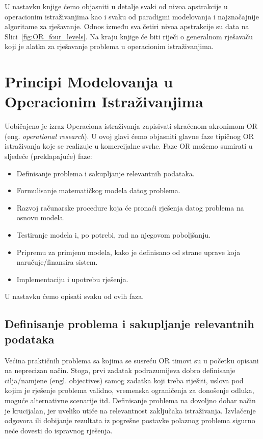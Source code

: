\documentclass[a4paper, utf8, 11pt, colorlinks]{book}
\begin{document}
U nastavku knjige ćemo objasniti u detalje svaki od nivoa apstrakcije u operacionim istraživanjima kao i svaku od paradigmi modelovanja i najznačajnije algoritame za rješavanje. Odnos između sva četiri nivoa apstrakcije su data na Slici~\ref{fig:OR_four_levels}. 
 Na kraju knjige će biti riječi o generalnom rješavaču koji je alatka za rješavanje problema u operacionim istraživanjima. 
 \\
 \newpage
 
 
\chapter{Principi Modelovanja u Operacionim Istraživanjima}
Uobičajeno je izraz Operaciona istraživanja zapisivati skraćenom akronimom OR (eng. \emph{operational research}). 
U ovoj glavi ćemo objasniti   glavne faze tipičnog OR istraživanja koje se realizuje u  komercijalne svrhe. Faze OR možemo sumirati u sljedeće (preklapajuće) faze: 
\begin{itemize}
    \item Definisanje problema i sakupljanje relevantnih podataka.
    \item Formulisanje matematičkog modela datog problema.
    \item Razvoj računarske procedure koja će pronaći rješenja datog problema na osnovu modela.
    \item Testiranje modela i, po potrebi, rad na njegovom poboljšanju.
    \item Pripremu za primjenu modela, kako je definisano od strane uprave koja naručuje/finansira sistem.
    \item Implementaciju i upotrebu rješenja.
\end{itemize}
 U nastavku ćemo opisati svaku od ovih faza.
 
 \section{Definisanje problema i sakupljanje relevantnih podataka}
 
Većina praktičnih problema sa kojima se susreću OR timovi su u početku opisani na neprecizan način. Stoga, prvi zadatak podrazumijeva dobro definisanje  cilja/namjene  (engl. objectives) samog zadatka koji treba riješiti, uslova pod kojim je rješenje problema validno,  vremenska ograničenja za donošenje odluka, moguće alternativne scenarije itd.  Definisanje problema na dovoljno dobar način je krucijalan, jer uveliko utiče na relevantnost zaključaka istraživanja. Izvlačenje odgovora ili dobijanje rezultata iz pogrešne postavke polaznog problema sigurno neće dovesti do ispravnog rješenja.  
\end{document}
